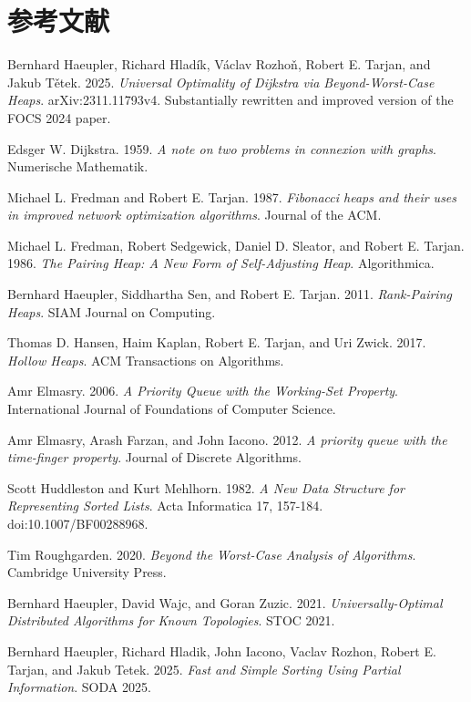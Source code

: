 \section*{参考文献}
\begin{enumerate}[label={[\arabic*]},leftmargin=3em,labelsep=.75em,itemsep=.5em,topsep=.3em,parsep=0pt]
\item Bernhard Haeupler, Richard Hladík, Václav Rozhoň, Robert E. Tarjan, and Jakub Tětek. 2025. \emph{Universal Optimality of Dijkstra via Beyond-Worst-Case Heaps}. arXiv:2311.11793v4. Substantially rewritten and improved version of the FOCS 2024 paper.
\item Edsger W. Dijkstra. 1959. \emph{A note on two problems in connexion with graphs}. Numerische Mathematik.
\item Michael L. Fredman and Robert E. Tarjan. 1987. \emph{Fibonacci heaps and their uses in improved network optimization algorithms}. Journal of the ACM.
\item Michael L. Fredman, Robert Sedgewick, Daniel D. Sleator, and Robert E. Tarjan. 1986. \emph{The Pairing Heap: A New Form of Self-Adjusting Heap}. Algorithmica.
\item Bernhard Haeupler, Siddhartha Sen, and Robert E. Tarjan. 2011. \emph{Rank-Pairing Heaps}. SIAM Journal on Computing.
\item Thomas D. Hansen, Haim Kaplan, Robert E. Tarjan, and Uri Zwick. 2017. \emph{Hollow Heaps}. ACM Transactions on Algorithms.
\item Amr Elmasry. 2006. \emph{A Priority Queue with the Working-Set Property}. International Journal of Foundations of Computer Science.
\item Amr Elmasry, Arash Farzan, and John Iacono. 2012. \emph{A priority queue with the time-finger property}. Journal of Discrete Algorithms.
\item Scott Huddleston and Kurt Mehlhorn. 1982. \emph{A New Data Structure for Representing Sorted Lists}. Acta Informatica 17, 157-184. doi:10.1007/BF00288968.
\item Tim Roughgarden. 2020. \emph{Beyond the Worst-Case Analysis of Algorithms}. Cambridge University Press.
\item Bernhard Haeupler, David Wajc, and Goran Zuzic. 2021. \emph{Universally-Optimal Distributed Algorithms for Known Topologies}. STOC 2021.
\item Bernhard Haeupler, Richard Hladik, John Iacono, Vaclav Rozhon, Robert E. Tarjan, and Jakub Tetek. 2025. \emph{Fast and Simple Sorting Using Partial Information}. SODA 2025.

\end{enumerate}
